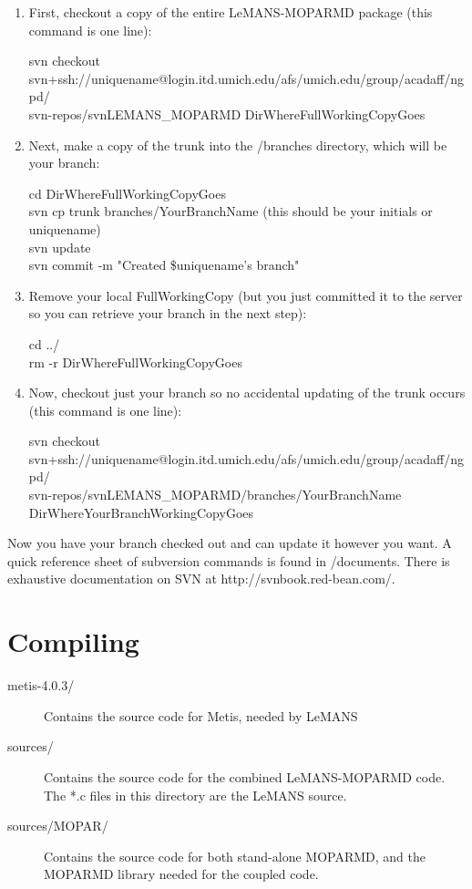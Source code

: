 \documentclass[]{article}
\begin{document}
\begin{enumerate}
\item First, checkout a copy of the entire  LeMANS-MOPARMD package (this command is one line):

svn checkout svn+ssh://uniquename@login.itd.umich.edu/afs/umich.edu/group/acadaff/ngpd/\\
			svn-repos/svnLEMANS\_MOPARMD DirWhereFullWorkingCopyGoes

\item Next, make a copy of the trunk into the /branches directory, which will be your branch:

cd DirWhereFullWorkingCopyGoes\\
svn cp trunk branches/YourBranchName (this should  be your initials or uniquename)\\
svn update\\
svn commit -m "Created \$uniquename's branch"\\

\item Remove your local FullWorkingCopy (but you just committed it to the server so you can retrieve your branch in the next step):

cd ../\\
rm -r DirWhereFullWorkingCopyGoes\\

\item Now, checkout just your branch so no accidental updating of the trunk occurs (this command is one line):

svn checkout svn+ssh://uniquename@login.itd.umich.edu/afs/umich.edu/group/acadaff/ngpd/\\
			svn-repos/svnLEMANS\_MOPARMD/branches/YourBranchName DirWhereYourBranchWorkingCopyGoes
\end{enumerate}

Now you have your branch checked out and can update it however you want.  A quick reference sheet of subversion commands is found in /documents.  There is exhaustive documentation on SVN at http://svnbook.red-bean.com/.

\section{Compiling}

\begin{description}
\item[metis-4.0.3/] Contains the source code for Metis, needed by LeMANS

\item[sources/] Contains the source code for the combined LeMANS-MOPARMD code. The *.c files in this directory are the LeMANS source.

\item[sources/MOPAR/] Contains the source code for both stand-alone MOPARMD, and the MOPARMD library needed for the coupled code. 

\end{description}
\end{document}
